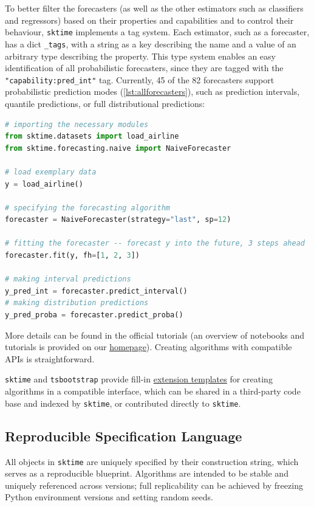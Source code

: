 To better filter the forecasters (as well as the other estimators such as classifiers and regressors) based on their properties and capabilities and to control their behaviour, \texttt{sktime} implements a tag system. Each estimator, such as a forecaster, has a dict \texttt{\_tags}, with a string as a key describing the name and a value of an arbitrary type describing the property.
This type system enables an easy identification of all probabilistic forecasters, since they are tagged with the \texttt{"capability:pred\_int"} tag. Currently, 45 of the 82 forecasters support probabilistic prediction modes (\autoref{lst:allforecasters}), such as prediction intervals, quantile predictions, or full distributional predictions:

\begin{lstlisting}[language=Python, caption=Exemplary probabilistic forecast with NaiveForecaster, label=lst:probabilisticforecast]
# importing the necessary modules
from sktime.datasets import load_airline
from sktime.forecasting.naive import NaiveForecaster

# load exemplary data
y = load_airline()

# specifying the forecasting algorithm
forecaster = NaiveForecaster(strategy="last", sp=12)

# fitting the forecaster -- forecast y into the future, 3 steps ahead
forecaster.fit(y, fh=[1, 2, 3])

# making interval predictions
y_pred_int = forecaster.predict_interval()
# making distribution predictions
y_pred_proba = forecaster.predict_proba()
\end{lstlisting}

More details can be found in the official tutorials (an overview of notebooks and tutorials is provided on our \href{https://www.sktime.net/en/latest/users.html}{homepage}).
Creating algorithms with compatible APIs is straightforward.

\texttt{sktime} and \texttt{tsbootstrap} provide fill-in \href{https://github.com/sktime/sktime/tree/main/extension_templates}{extension templates} for creating algorithms in a compatible interface, which can be shared in a third-party code base and indexed by \texttt{sktime}, or contributed directly to \texttt{sktime}.

\subsection{Reproducible Specification Language}
All objects in \texttt{sktime} are uniquely specified by their construction string, which serves as a reproducible blueprint. Algorithms are intended to be stable and uniquely referenced across versions; full replicability can be achieved by freezing Python environment versions and setting random seeds.

